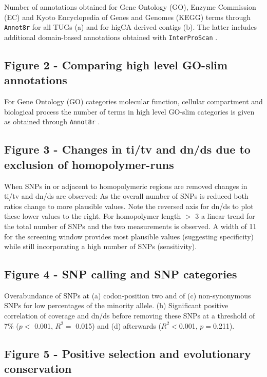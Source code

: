 \documentclass[10pt]{bmc_article}
\newenvironment{bmcformat}{\begin{raggedright}\baselineskip20pt\sloppy\setboolean{publ}{false}}{\end{raggedright}\baselineskip20pt\sloppy}
\begin{document}
\begin{bmcformat}
Number of annotations obtained for Gene Ontology (GO), Enzyme
Commission (EC) and Kyoto Encyclopedia of Genes and Genomes (KEGG)
terms through \texttt{Annot8r} \cite{schmid_annot8r:_2008} for all
TUGs (a) and for higCA derived contigs (b). The latter includes
additional domain-based annotations obtained with
\texttt{InterProScan} \cite{pmid11590104}.

\subsection*{Figure 2 - Comparing high level GO-slim annotations}

For Gene Ontology (GO) categories molecular function, cellular
compartment and biological process the number of terms in high level
GO-slim categories is given as obtained through \texttt{Annot8r}
\cite{schmid_annot8r:_2008}.

\subsection*{Figure 3 - Changes in ti/tv and dn/ds due to exclusion of
  homopolymer-runs}

When SNPs in or adjacent to homopolymeric regions are removed changes
in ti/tv and dn/ds are observed: As the overall number of SNPs is
reduced both ratios change to more plausible values. Note the reversed
axis for dn/ds to plot these lower values to the right. For
homopolymer length $>$ 3 a linear trend for the total number of SNPs
and the two measurements is observed. A width of 11 for the screening
window provides most plausible values (suggesting specificity) while
still incorporating a high number of SNPs (sensitivity).

\subsection*{Figure 4 - SNP calling and SNP categories}
 
Overabundance of SNPs at (a) codon-position two and of (c)
non-synonymous SNPs for low percentages of the minority allele. (b)
Significant positive correlation of coverage and dn/ds before removing
these SNPs at a threshold of 7\% ($p<$ 0.001, $R^2=$ 0.015) and (d)
afterwards ($R^2<$0.001, $p=$0.211).


\subsection*{Figure 5 - Positive selection and evolutionary
  conservation}


\end{bmcformat}
\end{document}
